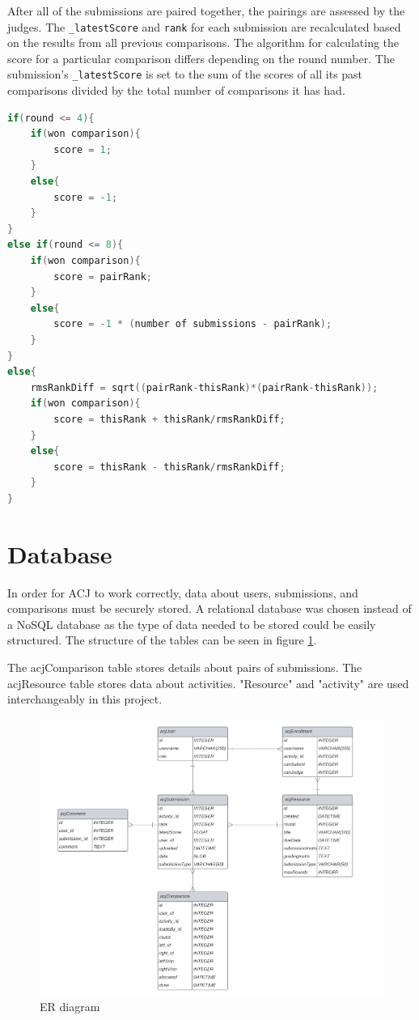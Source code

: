 \documentclass{l4proj}
\begin{document}
After all of the submissions are paired together, the pairings are assessed by the judges. The \lstinline{_latestScore} and \lstinline{rank} for each submission are recalculated based on the results from all previous comparisons. The algorithm for calculating the score for a particular comparison differs depending on the round number. The submission's \lstinline{_latestScore} is set to the sum of the scores of all its past comparisons divided by the total number of comparisons it has had.

\begin{lstlisting}[language=C, caption=Calculating the score for a submission for a particular round, captionpos=b]
if(round <= 4){
    if(won comparison){
        score = 1;
    }
    else{
        score = -1;
    }
}
else if(round <= 8){
    if(won comparison){
        score = pairRank;
    }
    else{
        score = -1 * (number of submissions - pairRank);
    }
}
else{
    rmsRankDiff = sqrt((pairRank-thisRank)*(pairRank-thisRank));
    if(won comparison){
        score = thisRank + thisRank/rmsRankDiff;
    }
    else{
        score = thisRank - thisRank/rmsRankDiff;
    }
}
\end{lstlisting}

\section{Database}
In order for ACJ to work correctly, data about users, submissions, and comparisons must be securely stored. A relational database was chosen instead of a NoSQL database as the type of data needed to be stored could be easily structured. The structure of the tables can be seen in figure \ref{fig:er}.

The acjComparison table stores details about pairs of submissions. The acjResource table stores data about activities. "Resource" and "activity" are used interchangeably in this project.


\begin{figure}[h]
\begin{center}
    \includegraphics[width=0.95\linewidth]{images/ER-diagram.png}    
    \caption{ER diagram}
    \label{fig:er}
\end{center}
\end{figure}
\end{document}
